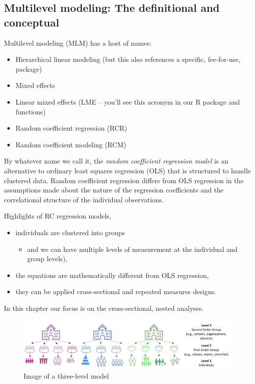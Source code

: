 \documentclass[
  english,
]{book}
\providecommand{\tightlist}{%
  \setlength{\itemsep}{0pt}\setlength{\parskip}{0pt}}
\begin{document}
\hypertarget{multilevel-modeling-the-definitional-and-conceptual}{%
\subsection{Multilevel modeling: The definitional and conceptual}\label{multilevel-modeling-the-definitional-and-conceptual}}

Multilevel modeling (MLM) has a host of names:

\begin{itemize}
\tightlist
\item
  Hierarchical linear modeling (but this also references a specific, fee-for-use, package)
\item
  Mixed effects
\item
  Linear mixed effects (LME -- you'll see this acronym in our R package and functions)
\item
  Random coefficient regression (RCR)
\item
  Random coefficient modeling (RCM)
\end{itemize}

By whatever name we call it, the \emph{random coefficient regression model} is an alternative to ordinary least squares regression (OLS) that is structured to handle clustered data. Random coefficient regression differs from OLS regression in the assumptions made about the nature of the regression coefficients and the correlational structure of the individual observations.

Highlights of RC regression models,

\begin{itemize}
\tightlist
\item
  individuals are clustered into groups

  \begin{itemize}
  \tightlist
  \item
    and we can have multiple levels of measurement at the individual and group levels),
  \end{itemize}
\item
  the equations are mathematically different from OLS regression,
\item
  they can be applied cross-sectional and repeated measures designs.
\end{itemize}

In this chapter our focus is on the cross-sectional, nested analyses.

\begin{figure}
\centering
\includegraphics{images/wiGroups/nesting.jpg}
\caption{Image of a three-level model}
\end{figure}
\end{document}

